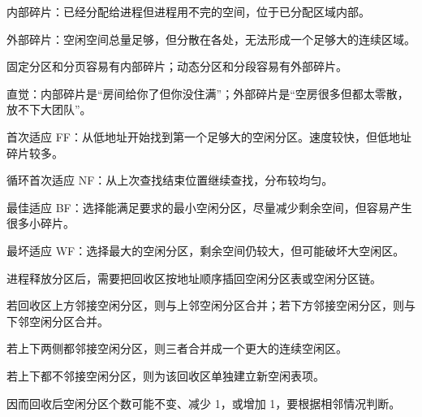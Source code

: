 \begin{points}
  \item 内部碎片：已经分配给进程但进程用不完的空间，位于已分配区域内部。
  \item 外部碎片：空闲空间总量足够，但分散在各处，无法形成一个足够大的连续区域。
  \item 固定分区和分页容易有内部碎片；动态分区和分段容易有外部碎片。
  \item 直觉：内部碎片是“房间给你了但你没住满”；外部碎片是“空房很多但都太零散，放不下大团队”。
\end{points}


\begin{points}
  \item 首次适应 FF：从低地址开始找到第一个足够大的空闲分区。速度较快，但低地址碎片较多。
  \item 循环首次适应 NF：从上次查找结束位置继续查找，分布较均匀。
  \item 最佳适应 BF：选择能满足要求的最小空闲分区，尽量减少剩余空间，但容易产生很多小碎片。
  \item 最坏适应 WF：选择最大的空闲分区，剩余空间仍较大，但可能破坏大空闲区。
\end{points}


\begin{points}
  \item 进程释放分区后，需要把回收区按地址顺序插回空闲分区表或空闲分区链。
  \item 若回收区上方邻接空闲分区，则与上邻空闲分区合并；若下方邻接空闲分区，则与下邻空闲分区合并。
  \item 若上下两侧都邻接空闲分区，则三者合并成一个更大的连续空闲区。
  \item 若上下都不邻接空闲分区，则为该回收区单独建立新空闲表项。
  \item 因而回收后空闲分区个数可能不变、减少 1，或增加 1，要根据相邻情况判断。
\end{points}


